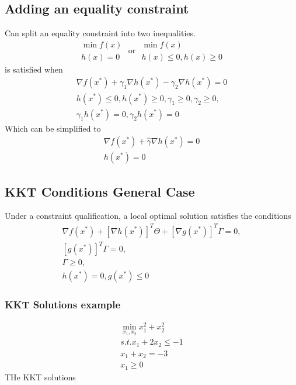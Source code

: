 \subsection{Adding an equality constraint}
Can split an equality constraint into two inequalities.
\begin{equation}
  \begin{aligned}
    \min f(x) \\
    h(x) = 0
  \end{aligned}
  \text{ or }
  \begin{aligned}
    \min f(x) \\
    h(x) \leq 0, h(x) \geq 0
  \end{aligned}
\end{equation}
is satisfied when
\begin{equation}
  \begin{aligned}
    \nabla f(x^*) + \gamma_1 \nabla h(x^*) - \gamma_2 \nabla h(x^*)  = 0 \\
    h(x^*) \leq 0, h(x^*) \geq 0, \gamma_1 \geq 0, \gamma_2 \geq 0, \\
    \gamma_1 h(x^*)=0, \gamma_2 h(x^*) = 0
  \end{aligned}
\end{equation}
Which can be simplified to 
\begin{equation}
  \begin{aligned}
    \nabla f(x^*)+ \hat{\gamma} \nabla h(x^*)  = 0 \\
    h(x^*) =0
  \end{aligned}
\end{equation}
\subsection{KKT Conditions General Case}
Under a constraint qualification, a local optimal solution satisfies the conditions
\begin{equation}
  \begin{aligned}
    \nabla f(x^*) + [\nabla h(x^*)]^T \Theta + [\nabla g(x^*)]^T \Gamma = 0, \\
    [g(x^*)]^T\Gamma = 0, \\
    \Gamma \geq 0, \\
    h(x^*) = 0, g(x^*) \leq 0
  \end{aligned}
\end{equation}
\subsubsection{KKT Solutions example}
\begin{equation}
  \begin{aligned}
    \min_{x_1,x_2} x_1^2 + x_2^2 \\
    s.t. x_1 + 2x_2 \leq -1 \\
    x_1+x_2 = -3 \\
    x_1 \geq 0
  \end{aligned}
\end{equation}
THe KKT solutions

